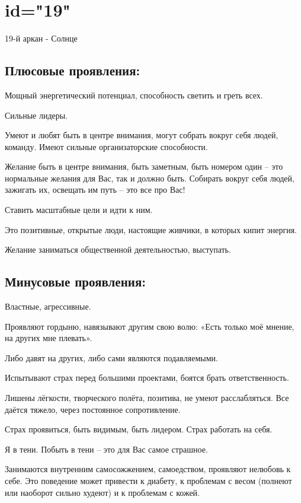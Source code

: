\endsection

\section{id="19"}{19-й аркан - Солнце}

\subsection{Плюсовые проявления:}
\item Мощный энергетический потенциал, способность светить и греть всех.
\item Сильные лидеры.
\item Умеют и любят быть в центре внимания, могут собрать вокруг себя людей, команду. Имеют сильные организаторские способности.
\item Желание быть в центре внимания, быть заметным, быть номером один – это нормальные желания для Вас, так и должно быть. Собирать вокруг себя людей, зажигать их, освещать им путь – это все про Вас!
\item Ставить масштабные цели и идти к ним.
\item Это позитивные, открытые люди, настоящие живчики, в которых кипит энергия.
\item Желание заниматься общественной деятельностью, выступать.
\endsubsection

\subsection{Минусовые проявления:}
\item Властные, агрессивные.
\item Проявляют гордыню, навязывают другим свою волю: «Есть только моё мнение, на других мне плевать».
\item Либо давят на других, либо сами являются подавляемыми.
\item Испытывают страх перед большими проектами, боятся брать ответственность.
\item Лишены лёгкости, творческого полёта, позитива, не умеют расслабляться. Все даётся тяжело, через постоянное сопротивление.
\item Страх проявиться, быть видимым, быть лидером. Страх работать на себя.
\item Я в тени. Побыть в тени – это для Вас самое страшное.
\item Занимаются внутренним самосожжением, самоедством, проявляют нелюбовь к себе. Это поведение может привести к диабету, к проблемам с весом (полнеют или наоборот сильно худеют) и к проблемам с кожей.
\endsubsection

